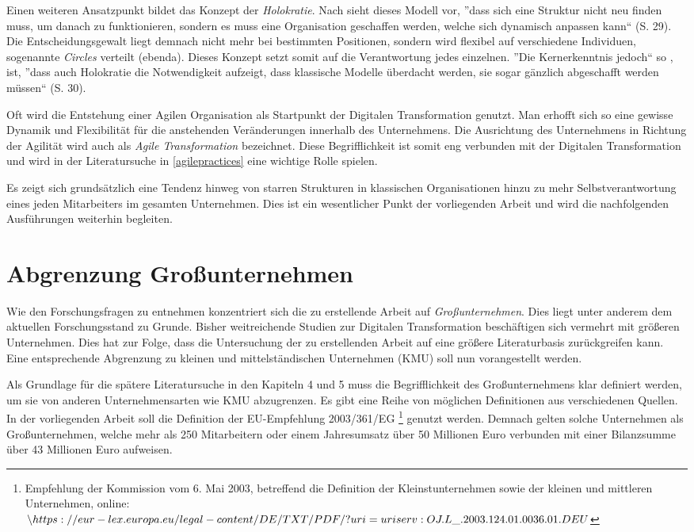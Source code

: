 Einen weiteren Ansatzpunkt bildet das Konzept der \textit{Holokratie}. Nach  sieht dieses Modell vor, ''dass sich eine Struktur nicht neu finden muss, um danach zu funktionieren, sondern es muss eine Organisation geschaffen werden, welche sich dynamisch anpassen kann`` (S. 29). Die Entscheidungsgewalt liegt demnach nicht mehr bei bestimmten Positionen, sondern wird flexibel auf verschiedene Individuen, sogenannte \textit{Circles} verteilt (ebenda). Dieses  Konzept setzt somit auf die Verantwortung jedes einzelnen. ''Die Kernerkenntnis jedoch`` so , ist,  ''dass auch Holokratie die Notwendigkeit aufzeigt, dass klassische Modelle überdacht werden, sie sogar gänzlich abgeschafft werden müssen`` (S. 30). 

Oft wird die Entstehung einer Agilen Organisation als Startpunkt der Digitalen Transformation genutzt. Man erhofft  sich so eine gewisse Dynamik und Flexibilität für die anstehenden Veränderungen innerhalb des Unternehmens. \cite[S. 1]{fuchs_becoming_nodate} Die Ausrichtung des Unternehmens in Richtung der Agilität wird auch als \textit{Agile Transformation} bezeichnet. Diese Begrifflichkeit ist somit eng verbunden mit der Digitalen Transformation und wird in der Literatursuche in \ref{agilepractices} eine wichtige Rolle spielen.

Es zeigt sich grundsätzlich eine Tendenz hinweg von starren Strukturen in klassischen Organisationen hinzu zu mehr Selbstverantwortung eines jeden Mitarbeiters im gesamten Unternehmen. Dies ist ein wesentlicher Punkt der vorliegenden Arbeit und wird die nachfolgenden Ausführungen weiterhin begleiten. 

\section{Abgrenzung Großunternehmen}

Wie den Forschungsfragen zu entnehmen konzentriert sich die zu erstellende Arbeit auf \textit{Großunternehmen}. Dies liegt unter anderem dem aktuellen Forschungsstand zu Grunde. Bisher weitreichende Studien zur Digitalen Transformation beschäftigen sich vermehrt mit größeren Unternehmen. Dies hat zur Folge, dass die Untersuchung der zu erstellenden Arbeit auf eine größere Literaturbasis zurückgreifen kann. Eine entsprechende Abgrenzung zu kleinen und mittelständischen Unternehmen (KMU) soll nun vorangestellt werden.

Als Grundlage für die spätere Literatursuche in den Kapiteln 4 und 5 muss die Begrifflichkeit  des Großunternehmens  klar definiert werden, um sie von anderen Unternehmensarten wie KMU abzugrenzen. Es gibt eine Reihe von möglichen Definitionen aus verschiedenen Quellen. In der vorliegenden Arbeit soll die Definition der EU-Empfehlung 2003/361/EG \footnote{Empfehlung der Kommission vom 6. Mai 2003, betreffend die Definition der Kleinstunternehmen sowie der kleinen und mittleren Unternehmen, online: $\url{https://eur-lex.europa.eu/legal-content/DE/TXT/PDF/?uri=uriserv:OJ.L_.2003.124.01.0036.01.DEU}$} genutzt werden. Demnach gelten solche Unternehmen als Großunternehmen, welche mehr als 250 Mitarbeitern oder einem Jahresumsatz über 50 Millionen Euro verbunden mit einer Bilanzsumme über 43 Millionen Euro aufweisen.

